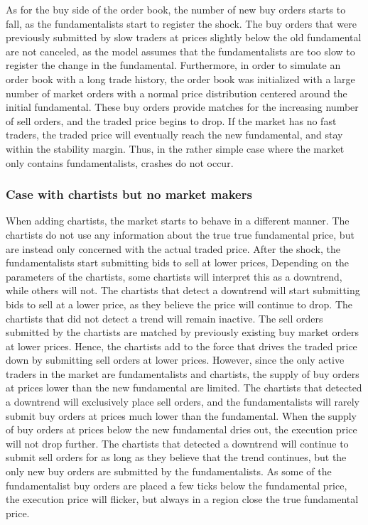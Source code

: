 As for the buy side of the order book, the number of new buy orders starts to fall, as the fundamentalists start to register the shock. The buy orders that were previously submitted by slow traders at prices slightly below the old fundamental are not canceled, as the model assumes that the fundamentalists are too slow to register the change in the fundamental. Furthermore, in order to simulate an order book with a long trade history, the order book was initialized with a large number of market orders with a normal price distribution centered around the initial fundamental. These buy orders provide matches for the increasing number of sell orders, and the traded price begins to drop. If the market has no fast traders, the traded price will eventually reach the new fundamental, and stay within the stability margin. Thus, in the rather simple case where the market only contains fundamentalists, crashes do not occur. 

\subsubsection*{Case with chartists but no market makers}
When adding chartists, the market starts to behave in a different manner. The chartists do not use any information about the true true fundamental price, but are instead only concerned with the actual traded price. After the shock, the fundamentalists start submitting bids to sell at lower prices, Depending on the parameters of the chartists, some chartists will interpret this as a downtrend, while others will not. The chartists that detect a downtrend will start submitting bids to sell at a lower price, as they believe the price will continue to drop. The chartists that did not detect a trend will remain inactive. The sell orders submitted by  the chartists are matched by previously existing buy market orders at lower prices. Hence, the chartists add to the force that drives the traded price down by submitting sell orders at lower prices. However, since the only active traders in the market are fundamentalists and chartists, the supply of buy orders at prices lower than the new fundamental are limited. The chartists that detected a downtrend will exclusively place sell orders, and the fundamentalists will rarely submit buy orders at prices much lower than the fundamental. When the supply of buy orders at prices below the new fundamental dries out, the execution price will not drop further. The chartists that detected a downtrend will continue to submit sell orders for as long as they believe that the trend continues, but the only new buy orders are submitted by the fundamentalists. As some of the fundamentalist buy orders are placed a few ticks below the fundamental price, the execution price will flicker, but always in a region close the true fundamental price.

